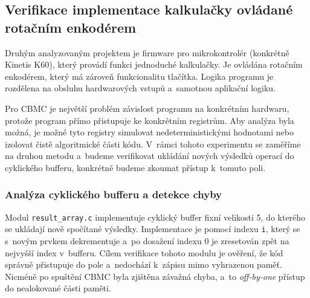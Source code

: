 \documentclass[a4paper, 11pt]{article}
\begin{document}
\subsection{Verifikace implementace kalkulačky ovládané rotačním enkodérem}\label{sec:CBMC_Experiments_IMP}

Druhým analyzovaným projektem je firmware pro mikrokontrolér (konkrétně Kinetis K60), který provádí funkci jednoduché kalkulačky.
Je ovládána rotačním enkodérem, který má zároveň funkcionalitu tlačítka.
Logika programu je rozdělena na obsluhu hardwarových vstupů a~samotnou aplikační logiku.

Pro CBMC je největší problém závislost programu na konkrétním hardwaru, protože program přímo přistupuje ke konkrétním registrům.
Aby analýza byla možná, je možné tyto registry simulovat nedeterministickými hodnotami nebo izolovat čistě algoritmické části kódu.
V~rámci tohoto experimentu se zaměříme na druhou metodu a~budeme verifikovat ukládání nových výsledků operací do cyklického bufferu, konkrétně budeme zkoumat přístup k~tomuto poli.

\subsubsection{Analýza cyklického bufferu a detekce chyby}

Modul \texttt{result\_array.c} implementuje cyklický buffer fixní velikosti 5, do kterého se ukládají nově spočítané výsledky.
Implementace je pomocí indexu \texttt{i}, který se s~novým prvkem dekrementuje a~po dosažení indexu 0 je zresetován zpět na nejvyšší index v~bufferu.
Cílem verifikace tohoto modulu je ověření, že kód správně přistupuje do pole a~nedochází k~zápisu mimo vyhrazenou paměť.
Nicméně po spuštění CBMC byla zjištěna závažná chyba, a~to \emph{off-by-one} přístup do nealokované části paměti.
\end{document}
